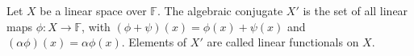 Let $X$ be a linear space over $\mathbb{F}$. The algebraic conjugate $X'$ is the set of all linear maps $\phi: X \to \mathbb{F}$, with $(\phi+\psi)(x) = \phi(x)+\psi(x)$ and $(\alpha\phi)(x) = \alpha\phi(x)$. Elements of $X'$ are called linear functionals on $X$.